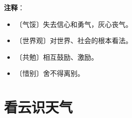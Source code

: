 \documentclass[12pt,UTF-8,openany]{ctexbook}
\begin{document}
\newpage

\textbf{注释}：

\vspace{-1em}

\begin{itemize}
    \setlength\itemsep{-0.2em}
    \item 〔气馁〕失去信心和勇气，灰心丧气。
    \item 〔世界观〕对世界、社会的根本看法。
    \item 〔共勉〕相互鼓励、激励。
    \item 〔惜别〕舍不得离别。
\end{itemize}

\chapter{看云识天气}
\end{document}
